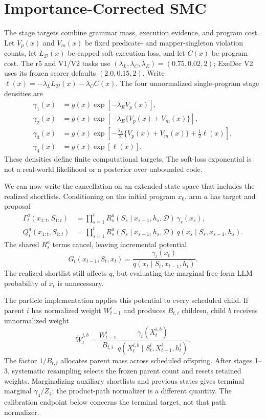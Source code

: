 \documentclass[twoside,11pt]{article}
\newcommand{\data}{\mathcal{D}}
\begin{document}
\section{Importance-Corrected SMC}
\label{sec:smc}

The stage targets combine grammar mass, execution evidence, and program cost.
Let $V_p(x)$ and $V_m(x)$ be fixed predicate- and mapper-singleton violation
counts, let $L_{\data}(x)$ be capped soft execution loss, and let $C(x)$ be
program cost. The r5 and V1/V2 tasks use
$(\lambda_L,\lambda_C,\lambda_E)=(0.75,0.02,2)$; ExeDec V2 uses its frozen
scorer defaults $(2.0,0.15,2)$. Write
$\ell(x)=-\lambda_L L_{\data}(x)-\lambda_C C(x)$. The four unnormalized
single-program stage densities are
\begin{align}
\gamma_1(x)&=g(x)\exp[-\lambda_E V_p(x)],\nonumber\\
\gamma_2(x)&=g(x)\exp[-\lambda_E\{V_p(x)+V_m(x)\}],\nonumber\\
\gamma_3(x)&=g(x)\exp[-\tfrac{\lambda_E}{2}\{V_p(x)+V_m(x)\}
  +\tfrac12\ell(x)],\nonumber\\
\gamma_4(x)&=g(x)\exp[\ell(x)].
\label{eq:stage-targets}
\end{align}
These densities define finite computational targets. The soft-loss exponential
is not a real-world likelihood or a posterior over unbounded code.

We can now write the cancellation on an extended state space that includes the
realized shortlists. Conditioning on the initial program $x_0$, arm $a$ has
target and proposal
\begin{align}
\Gamma_t^a(x_{1:t},S_{1:t})
&=\prod_{s=1}^t R_s^a(S_s\mid x_{s-1},h_s,\data)\,\gamma_s(x_s),\nonumber\\
Q_t^a(x_{1:t},S_{1:t})
&=\prod_{s=1}^t R_s^a(S_s\mid x_{s-1},h_s,\data)\,
q(x_s\mid S_s,x_{s-1},h_s).
\end{align}
The shared $R_s^a$ terms cancel, leaving incremental potential
\begin{equation}
G_t(x_{t-1},S_t,x_t)=
\frac{\gamma_t(x_t)}{q(x_t\mid S_t,x_{t-1},h_t)}.
\label{eq:potential}
\end{equation}
The realized shortlist still affects $q$, but evaluating the marginal
free-form LLM probability of $x_t$ is unnecessary.

The particle implementation applies this potential to every scheduled child.
If parent $i$ has normalized weight $W_{t-1}^i$ and produces $B_{t,i}$ children,
child $b$ receives unnormalized weight
\begin{equation}
\widetilde W_t^{i,b}=\frac{W_{t-1}^i}{B_{t,i}}
\frac{\gamma_t(X_t^{i,b})}
{q(X_t^{i,b}\mid S_t^i,X_{t-1}^i,h_t^i)}.
\label{eq:child-weight}
\end{equation}
The factor $1/B_{t,i}$ allocates parent mass across scheduled offspring. After
stages 1--3, systematic resampling selects the frozen parent count and resets
retained weights. Marginalizing auxiliary shortlists and previous states gives
terminal marginal $\gamma_4/Z_4$; the product-path normalizer is a different
quantity. The calibration endpoint below concerns the terminal target, not that
path normalizer.
\end{document}

